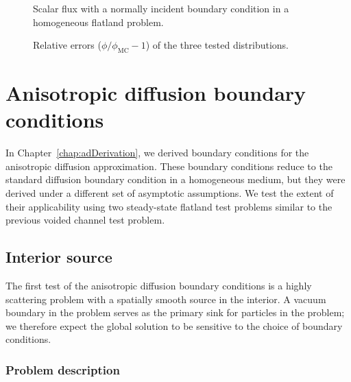 \begin{figure}[tb]
  \centering\small
  \hspace{-.25in}%
  
  \caption{Scalar flux with a normally incident boundary condition in a
  homogeneous flatland problem.}
  \label{fig:flatlandBcDelta}
\end{figure}
 
\begin{figure}[tb]
  \centering\small
  \hspace{-.25in}%
  
  \caption{Relative errors ($\phi/\phi_\text{MC} - 1$) of the three tested
  distributions.}
  \label{fig:flatlandBcRelative}
\end{figure}

\thesisclearpage
\section{Anisotropic diffusion boundary conditions}

In Chapter~\ref{chap:adDerivation}, we derived boundary conditions for the
anisotropic diffusion approximation. These boundary conditions reduce to the
standard diffusion boundary condition in a homogeneous medium, but they were
derived under a different set of asymptotic assumptions. We test the extent of
their applicability using two steady-state flatland test problems similar to
the previous voided channel test problem.

\subsection{Interior source}

The first test of the anisotropic diffusion boundary conditions is a highly
scattering problem with a spatially smooth source in the interior. A vacuum
boundary in the problem serves as the primary sink for particles in the
problem; we therefore expect the global solution to be sensitive to the choice
of boundary conditions.

\subsubsection{Problem description}

